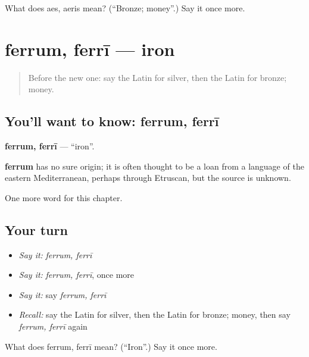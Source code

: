 \begin{tcolorbox}[breakable,colback=teal!4,colframe=teal!35!black,title={Before you move on}]
What does aes, aeris mean? (\textquotedblleft{}Bronze; money\textquotedblright{}.) Say it once more.
\end{tcolorbox}
\section[ferrum, ferrī]{ferrum, ferrī — iron}

\label{lesson:LA-C222-ferrum}



\begin{quote}
Before the new one: say the Latin for silver, then the Latin for bronze; money.
\end{quote}

\subsection*{You'll want to know: ferrum, ferrī}
\textbf{ferrum, ferrī} — \textquotedblleft{}iron\textquotedblright{}.

\begin{cousinweb}
\textbf{ferrum} has no sure origin; it is often thought to be a loan from a language of the eastern Mediterranean, perhaps through Etruscan, but the source is unknown.
\end{cousinweb}

\begin{grammarlens}[title={What you've built}]
One more word for this chapter.
\end{grammarlens}

\subsection*{Your turn}
\begin{itemize}
\raggedright
  \item \emph{Say it:} \emph{ferrum, ferrī}
  \item \emph{Say it:} \emph{ferrum, ferrī}, once more
  \item \emph{Say it:} say \emph{ferrum, ferrī}
  \item \emph{Recall:} say the Latin for silver, then the Latin for bronze; money, then say \emph{ferrum, ferrī} again
\end{itemize}

\begin{tcolorbox}[breakable,colback=teal!4,colframe=teal!35!black,title={Before you move on}]
What does ferrum, ferrī mean? (\textquotedblleft{}Iron\textquotedblright{}.) Say it once more.
\end{tcolorbox}
